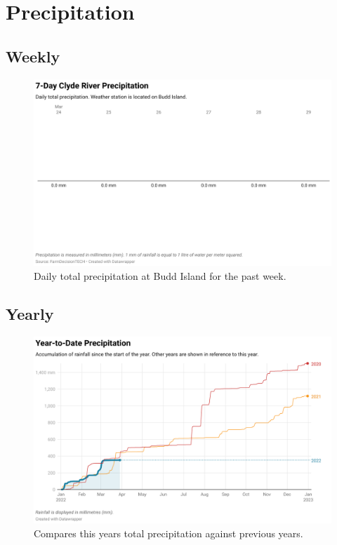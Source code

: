 \documentclass[10pt]{article}
\begin{document}
\section{Precipitation}
\subsection{Weekly}

\begin{figure}[H]
\centering
\includegraphics[width=\textwidth]{weekly-precipitation.png}
\caption[Daily Total Precipitation Budd Island]{Daily total precipitation at Budd Island for the past week.}
\end{figure}

\subsection{Yearly}
\begin{figure}[H]
\centering
\includegraphics[width=\textwidth]{yearly-precipitation.png}
\caption[Yearly Cumulative Precipitation Budd Island]{Compares this years total precipitation against previous years.}
\end{figure}
\end{document}
